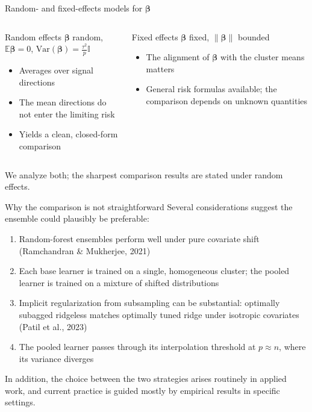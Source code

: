 \documentclass[aspectratio=169,11pt]{beamer}
\newcommand{\E}{\mathbb{E}}
\newcommand{\bbeta}{\bm{\beta}}
\begin{document}
\begin{frame}{Random- and fixed-effects models for $\bbeta$}
  \begin{columns}[T]
    \begin{block}{\small Random effects}
      \small $\bbeta$ random, $\E\bbeta = 0$, $\mathrm{Var}(\bbeta) = \tfrac{\tau^2}{p}\mathbb{I}$
      \begin{itemize}\small
        \item Averages over signal directions
        \item The mean directions do not enter the limiting risk
        \item Yields a clean, closed-form comparison
      \end{itemize}
    \end{block}
    \begin{block}{\small Fixed effects}
      \small $\bbeta$ fixed, $\|\bbeta\|$ bounded
      \begin{itemize}\small
        \item The alignment of $\bbeta$ with the cluster means matters
        \item General risk formulas available; the comparison depends on unknown quantities
      \end{itemize}
    \end{block}
  \end{columns}
  \vspace{2mm}
  We analyze both; the sharpest comparison results are stated under random effects.
\end{frame}

\begin{frame}{Why the comparison is not straightforward}
  Several considerations suggest the ensemble could plausibly be preferable:
  \begin{enumerate}
    \item Random-forest ensembles perform well under pure covariate shift (Ramchandran \& Mukherjee, 2021)
    \item Each base learner is trained on a single, homogeneous cluster; the pooled learner is trained on a mixture of shifted distributions
    \item Implicit regularization from subsampling can be substantial: optimally subagged ridgeless matches optimally tuned ridge under isotropic covariates (Patil et al., 2023)
    \item The pooled learner passes through its interpolation threshold at $p \approx n$, where its variance diverges
  \end{enumerate}
  \vspace{2mm}
  In addition, the choice between the two strategies arises routinely in applied work, and current practice is guided mostly by empirical results in specific settings.
\end{frame}
\end{document}
